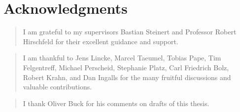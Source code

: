 \begingroup
\let\raggedsection\centering

\chapter*{Acknowledgments} \label{cha:acknowledgments}
\endgroup

\begin{quotation}
  \noindent I am grateful to my supervisors Bastian Steinert and Professor Robert Hirschfeld for their excellent guidance and support. 
\end{quotation}

\begin{quotation}
  \noindent I am thankful to Jens Lincke, Marcel Taeumel, Tobias Pape, Tim Felgentreff, Michael Perscheid, Stephanie Platz, Carl Friedrich Bolz, Robert Krahn, and Dan Ingalls for the many fruitful discussions and valuable contributions.
\end{quotation}

\begin{quotation}
  \noindent I thank Oliver Buck for his comments on drafts of this thesis.
\end{quotation}

